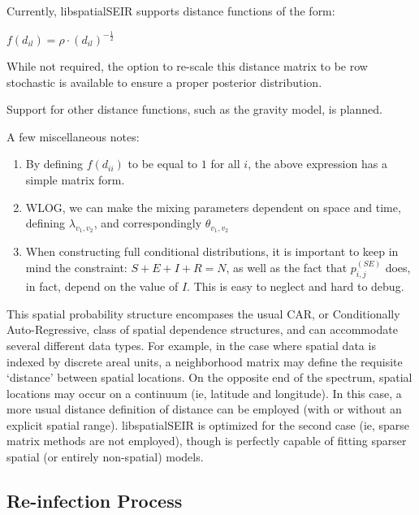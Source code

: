 \documentclass[12pt]{article}
\newcommand \mbreak {\\ \vspace{0.1in}}
\begin{document}
Currently, libspatialSEIR supports distance functions of the form:

\begin{center}
    $f(d_{il}) = \rho \cdot (d_{il})^{-\frac{1}{2}}$
\end{center}

While not required, the option to re-scale this distance matrix to be row stochastic is available to ensure a 
proper posterior distribution. 

Support for other distance functions, such as the gravity model, is planned. \mbreak


A few miscellaneous notes: 
\begin{enumerate}
    \item By defining $f(d_{ii})$ to be equal to $1$ for all $i$, the above expression has a simple 
        matrix form. 
    \item WLOG, we can make the mixing parameters dependent on space and time, defining $\lambda_{v_1, v_2}$,
        and correspondingly $\theta_{v_1,v_2}$
    \item When constructing full conditional distributions, it is important to keep in mind the constraint:
        $S+E+I+R=N$, as well as the fact that $p_{i,j}^{(SE)}$ does, in fact, depend on the value of $I$.
        This is easy to neglect and hard to debug.  \\
        
\end{enumerate}

This spatial probability structure encompases the usual CAR, or Conditionally Auto-Regressive, class
of spatial dependence structures, and can accommodate several different data types. For example, 
in the case where spatial data is indexed by discrete areal units, a neighborhood matrix may define
the requisite `distance' between spatial locations. On the opposite end of the spectrum, spatial locations 
may occur on a continuum (ie, latitude and longitude). In this case, a more usual distance definition of 
distance can be employed (with or without an explicit spatial range). libspatialSEIR is optimized for the 
second case (ie, sparse matrix methods are not employed), though is perfectly
capable of fitting sparser spatial (or entirely non-spatial) models.\\ 


\subsection{Re-infection Process}
\end{document}
